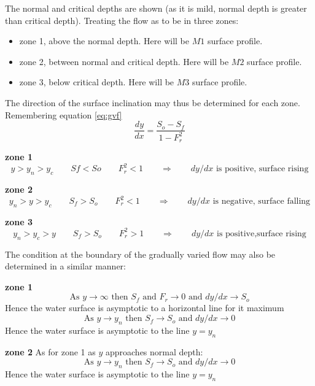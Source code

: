 \documentclass[a4paper, 12pt, british]{article} %
\numberwithin{equation}{section}
\numberwithin{figure}{section}
\numberwithin{table}{section}
\begin{document}
The normal and critical depths are shown (as it is mild, normal depth is greater than critical depth). Treating the flow as to be in three zones: 
\begin{itemize}
	\item zone 1, above the normal depth. Here will be $M1$ surface profile. 
\item zone 2, between normal and critical depth. Here will be $M2$ surface profile. 
\item zone 3, below critical depth. Here will be  $M3$ surface profile. 
\end{itemize}
The direction of the surface inclination may thus be determined for each zone. Remembering equation \ref{eq:gvf}
\begin{equation*}
\frac{dy}{dx} = \frac{S_o-S_f}{1 - F_r^2}
\label{eq:gvf_v2} %
\end{equation*} 

\textbf{zone 1}
\begin{equation*}
y > y_n > y_c		\qquad	Sf < So		\qquad	F_r^2 < 1	\qquad \Rightarrow	\qquad	dy/dx \text{ is positive, surface rising}
\end{equation*}

\textbf{zone 2}
\begin{equation*}
y_n > y > y_c	\qquad	S_f > S_o	\qquad	F_r^2 < 1		\qquad \Rightarrow	\qquad		dy/dx \text{ is negative, surface falling}
\end{equation*}

\textbf{zone 3}
\begin{equation*}
y_n > y_c > y	\qquad	S_f > S_o	\qquad	F_r^2 > 1		\qquad \Rightarrow	\qquad		dy/dx \text{ is positive,surface rising
}
\end{equation*}

The condition at the boundary of the gradually varied flow may also be determined in a similar manner:

\textbf{zone 1}
\begin{equation*}
\text{As } y \rightarrow \infty \text{ then } S_f \text{ and } F_r \rightarrow 0 \text{ and } dy/dx \rightarrow S_o
\end{equation*}
Hence the water surface is asymptotic to a horizontal line for it maximum
\begin{equation*}
\text{As } y \rightarrow y_n \text{ then } S_f \rightarrow S_o \text{ and } dy/dx \rightarrow 0
\end{equation*}
Hence the water surface is asymptotic to the line $y = y_n$

\textbf{zone 2}
As for zone 1 as $y$ approaches  normal depth:
\begin{equation*}
\text{As } y \rightarrow y_n \text{ then } S_f \rightarrow S_o \text{ and } dy/dx \rightarrow 0
\end{equation*}
Hence the water surface is asymptotic to the line $y = y_n$
\end{document}

